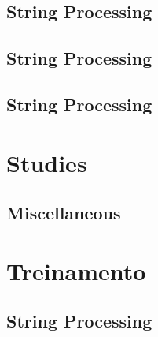 \raggedbottom
\vspace{-.7\baselineskip}\hrulefill
\vspace{0.1\baselineskip}\subsection{String Processing}
\raggedbottom
\vspace{-.7\baselineskip}\hrulefill
\vspace{0.1\baselineskip}\subsection{String Processing}
\raggedbottom
\vspace{-.7\baselineskip}\hrulefill
\vspace{0.1\baselineskip}\subsection{String Processing}
\raggedbottom
\vspace{-.7\baselineskip}\hrulefill
\vspace{0.1\baselineskip}
\section{Studies}
\subsection{Miscellaneous}
\raggedbottom
\vspace{-.7\baselineskip}\hrulefill
\vspace{0.1\baselineskip}
\section{Treinamento}
\subsection{String Processing}
\raggedbottom
\vspace{-.7\baselineskip}\hrulefill
\vspace{0.1\baselineskip}
